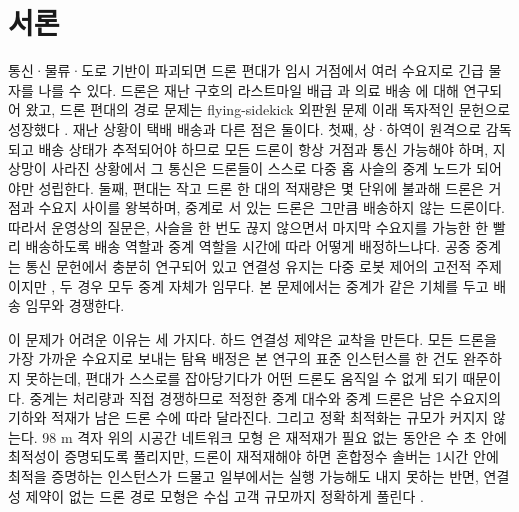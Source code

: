 \documentclass[final,5p,times,twocolumn]{elsarticle}
\begin{document}
\section{서론}
\label{sec:intro}

통신·물류·도로 기반이 파괴되면 드론 편대가 임시 거점에서 여러 수요지로 긴급 물자를 나를 수
있다. 드론은 재난 구호의 라스트마일 배급 \cite{chowdhury2017,rabta2018,erdelj2017}과 의료 배송
\cite{kim2017,ghelichi2021}에 대해 연구되어 왔고, 드론 편대의 경로 문제는 flying-sidekick 외판원
문제 이래 독자적인 문헌으로 성장했다 \cite{murray2015,otto2018,macrina2020,chung2020}. 재난 상황이
택배 배송과 다른 점은 둘이다. 첫째, 상·하역이 원격으로 감독되고 배송 상태가 추적되어야 하므로 모든
드론이 항상 거점과 통신 가능해야 하며, 지상망이 사라진 상황에서 그 통신은 드론들이 스스로 다중 홉
사슬의 중계 노드가 되어야만 성립한다. 둘째, 편대는 작고 드론 한 대의 적재량은 몇 단위에 불과해
드론은 거점과 수요지 사이를 왕복하며, 중계로 서 있는 드론은 그만큼 배송하지 않는 드론이다. 따라서
운영상의 질문은, 사슬을 한 번도 끊지 않으면서 마지막 수요지를 가능한 한 빨리 배송하도록 배송
역할과 중계 역할을 시간에 따라 어떻게 배정하느냐다. 공중 중계는 통신 문헌에서 충분히 연구되어
있고 \cite{zeng2016,mozaffari2019,burdakov2010} 연결성 유지는 다중 로봇 제어의 고전적 주제이지만
\cite{zavlanos2011,dixon2009}, 두 경우 모두 중계 자체가 임무다. 본 문제에서는 중계가 같은
기체를 두고 배송 임무와 경쟁한다.

이 문제가 어려운 이유는 세 가지다. 하드 연결성 제약은 교착을 만든다. 모든 드론을 가장 가까운
수요지로 보내는 탐욕 배정은 본 연구의 표준 인스턴스를 한 건도 완주하지 못하는데, 편대가 스스로를
잡아당기다가 어떤 드론도 움직일 수 없게 되기 때문이다. 중계는 처리량과 직접 경쟁하므로 적정한 중계
대수와 중계 드론은 남은 수요지의 기하와 적재가 남은 드론 수에 따라 달라진다. 그리고 정확 최적화는
규모가 커지지 않는다. 98 m 격자 위의 시공간 네트워크 모형 \cite{ford1962,skutella2009}은 재적재가 필요 없는 동안은
수 초 안에 최적성이 증명되도록 풀리지만, 드론이 재적재해야 하면 혼합정수 솔버는 1시간 안에 최적을
증명하는 인스턴스가 드물고 일부에서는 실행 가능해도 내지 못하는 반면, 연결성 제약이 없는 드론
경로 모형은 수십 고객 규모까지 정확하게 풀린다 \cite{roberti2021}.
\end{document}
